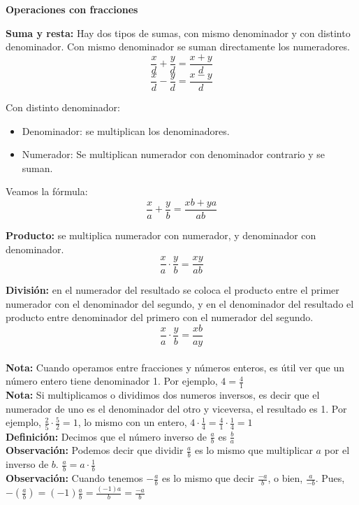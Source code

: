\documentclass{article}
\begin{document}
\begin{normalsize}
\begin{center}
\textbf{Operaciones con fracciones}
\end{center}
\end{normalsize}

\begin{normalsize}
\textbf{Suma y resta:} Hay dos tipos de sumas, con mismo denominador y con distinto denominador.
Con mismo denominador se suman directamente los numeradores.
\[\frac{x}{d}+\frac{y}{d}=\frac{x+y}{d}\]
\[\frac{x}{d}-\frac{y}{d}=\frac{x-y}{d}\]

Con distinto denominador:
\begin{itemize}
	\item Denominador: se multiplican los denominadores.
	\item Numerador: Se multiplican numerador con denominador contrario y se suman.
\end{itemize}
Veamos la fórmula:
\[\frac{x}{a}+\frac{y}{b}=\frac{xb+ya}{ab}\]

\textbf{Producto:} se multiplica numerador con numerador, y denominador con denominador.
\[\frac{x}{a}\cdot\frac{y}{b}=\frac{xy}{ab}\]

\textbf{División:} en el numerador del resultado se coloca el producto entre el primer numerador con el denominador del segundo, y en el denominador del resultado el producto entre denominador del primero con el numerador del segundo.
\[\frac{x}{a}\cdot\frac{y}{b}=\frac{xb}{ay}\]\\

\textbf{Nota:} Cuando operamos entre fracciones y números enteros, es útil ver que un número entero tiene denominador 1. Por ejemplo, $4=\frac{4}{1}$\\

\textbf{Nota:} Si multiplicamos o dividimos dos numeros inversos, es decir que el numerador de uno es el denominador del otro y viceversa, el resultado es 1. Por ejemplo, $\frac{2}{5}\cdot\frac{5}{2}=1$, lo mismo con un entero, $4\cdot\frac{1}{4}=\frac{4}{1}\cdot\frac{1}{4}=1$\\

\textbf{Definición:} Decimos que el número inverso de $\frac{a}{b}$ es $\frac{b}{a}$\\

\textbf{Observación:} Podemos decir que dividir $\frac{a}{b}$ es lo mismo que multiplicar $a$ por el inverso de $b$. $\frac{a}{b}=a\cdot\frac{1}{b}$\\

\textbf{Observación:} Cuando tenemos $-\frac{a}{b}$ es lo mismo que decir $\frac{-a}{b}$, o bien, $\frac{a}{-b}$. Pues, $-(\frac{a}{b})=(-1)\frac{a}{b}=\frac{(-1)a}{b}=\frac{-a}{b}$\\
\end{normalsize}
\end{document}
